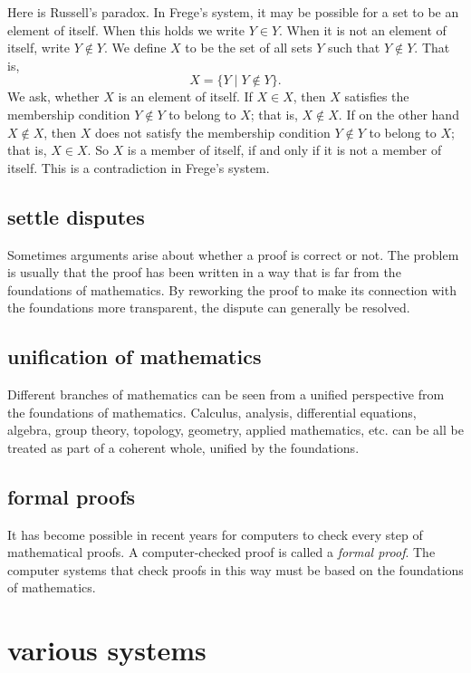 \documentclass[cup9a]{cupbook}
\begin{document}
Here is Russell's paradox.  In Frege's system, it may be possible for a set to be an element of itself.  When this holds we write $Y\in Y$.  When it is not an element of itself, write $Y\not\in Y$.   We define $X$ to be the set of all sets $Y$ such that $Y\not\in Y$.  That is,
    $$X = \{Y\mid Y\not\in Y\}.$$
We ask, whether $X$ is an element of itself.    If $X\in X$, then $X$ satisfies the membership condition $Y\not\in Y$ to belong to $X$;  that is, $X\not\in X$.
If on the other hand $X\not\in X$, then $X$ does not satisfy the membership condition $Y\not\in Y$ to belong to $X$; that is, $X\in X$.  So $X$ is a member of itself, if and only if it is not a member of itself.  This is a contradiction in Frege's system.

\subsection{settle disputes}

Sometimes arguments arise about whether a proof is correct or not.  The problem is usually that the proof has been written in a way that is far from the foundations of mathematics.  By reworking the proof to make its connection with the foundations more transparent, the dispute can generally be resolved.

\subsection{unification of mathematics}

Different branches of mathematics can be seen from a unified perspective from the foundations of mathematics.  Calculus, analysis, differential equations, algebra, group theory, topology, geometry, applied mathematics, etc. can be all be treated as part of a coherent whole, unified by the foundations.

\subsection{formal proofs}

It has become possible in recent years for computers to check every step of mathematical proofs.  A computer-checked proof is called a {\it formal proof}.  The computer systems that check proofs in this way must be based on the foundations of mathematics.

\section{various systems}
\end{document}
